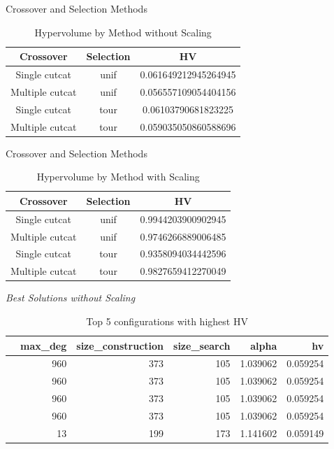 \begin{frame}{Crossover and Selection Methods}
    \begin{table}[h]
        \caption{Hypervolume by Method without Scaling}
        \begin{tabular}{ccc}
            \toprule
            Crossover & Selection & HV \\
            \midrule
            Single cutcat & unif & 0.061649212945264945 \\
            Multiple cutcat & unif & 0.056557109054404156 \\
            Single cutcat & tour & 0.06103790681823225 \\
            Multiple cutcat & tour & 0.059035050860588696 \\
            \bottomrule
        \end{tabular}
    \end{table}
\end{frame}

\begin{frame}{Crossover and Selection Methods}
    \begin{table}[h]
        \caption{Hypervolume by Method with Scaling}
        \begin{tabular}{ccc}
            \toprule
            Crossover & Selection & HV \\
            \midrule
            Single cutcat & unif & 0.9944203900902945 \\
            Multiple cutcat & unif & 0.9746266889006485 \\
            Single cutcat & tour & 0.9358094034442596 \\
            Multiple cutcat & tour & 0.9827659412270049 \\
            \bottomrule
        \end{tabular}
    \end{table}
\end{frame}

\begin{frame}{\textit{Best Solutions without Scaling}}
    \begin{table}[h]
        \caption{Top 5 configurations with highest HV}
        \begin{tabular}{lrrrrr}
        \toprule
         & max\_deg & size\_construction & size\_search & alpha & hv \\
        \midrule
         & 960 & 373 & 105 & 1.039062 & 0.059254 \\
         & 960 & 373 & 105 & 1.039062 & 0.059254 \\
         & 960 & 373 & 105 & 1.039062 & 0.059254 \\
         & 960 & 373 & 105 & 1.039062 & 0.059254 \\
         & 13 & 199 & 173 & 1.141602 & 0.059149 \\
        \bottomrule
        \end{tabular}
    \end{table}
\end{frame}

